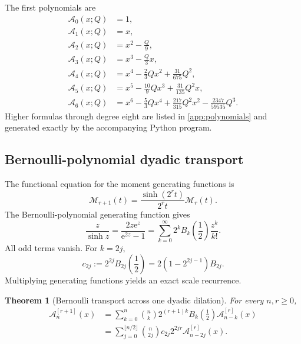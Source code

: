 \documentclass[11pt,oneside]{article}
\newtheorem{theorem}{Theorem}[section]
\theoremstyle{definition}
\theoremstyle{remark}
\newcommand{\e}{\mathrm e}
\newcommand{\Acard}{\mathcal A}
\newcommand{\M}{\mathcal M}
\begin{document}
The first polynomials are
\begin{align}
 \Acard_0(x;Q)&=1,\\
 \Acard_1(x;Q)&=x,\\
 \Acard_2(x;Q)&=x^2-\frac Q9,\\
 \Acard_3(x;Q)&=x^3-\frac Q3x,\\
 \Acard_4(x;Q)&=x^4-\frac23Qx^2+\frac{31}{675}Q^2,\\
 \Acard_5(x;Q)&=x^5-\frac{10}{9}Qx^3+\frac{31}{135}Q^2x,\\
 \Acard_6(x;Q)&=x^6-\frac53Qx^4+\frac{217}{315}Q^2x^2-\frac{2347}{59535}Q^3.
 \label{eq:first-appell-polys}
\end{align}
Higher formulas through degree eight are listed in \cref{app:polynomials} and generated exactly by the accompanying Python program.

\subsection{Bernoulli-polynomial dyadic transport}
The functional equation for the moment generating functions is
\begin{equation}
 \M_{r+1}(t)=\frac{\sinh(2^rt)}{2^rt}\M_r(t).
 \label{eq:mgf-scale}
\end{equation}
The Bernoulli-polynomial generating function gives
\begin{equation}
 \frac z{\sinh z}
 =\frac{2z\e^z}{\e^{2z}-1}
 =\sum_{k=0}^{\infty}2^kB_k\!\left(\frac12\right)\frac{z^k}{k!}.
 \label{eq:bernoulli-half}
\end{equation}
All odd terms vanish.  For $k=2j$,
\begin{equation}
 c_{2j}:=2^{2j}B_{2j}\!\left(\frac12\right)
 =2(1-2^{2j-1})B_{2j}.
 \label{eq:c2j}
\end{equation}
Multiplying generating functions yields an exact scale recurrence.

\begin{theorem}[Bernoulli transport across one dyadic dilation]
\label{thm:bernoulli-transport}
For every $n,r\ge0$,
\begin{align}
 \Acard_n^{[r+1]}(x)
 &=\sum_{k=0}^{n}\binom nk
  2^{(r+1)k}B_k\!\left(\frac12\right)
  \Acard_{n-k}^{[r]}(x)
 \label{eq:bernoulli-transport}\\
 &=\sum_{j=0}^{\lfloor n/2\rfloor}
  \binom n{2j}c_{2j}2^{2jr}
  \Acard_{n-2j}^{[r]}(x).
 \label{eq:bernoulli-transport-even}
\end{align}
\end{theorem}
\end{document}
